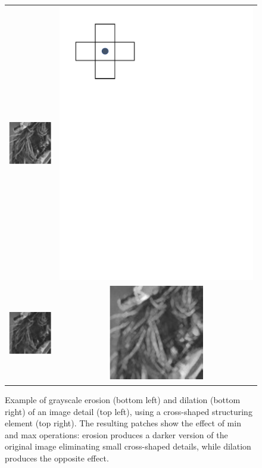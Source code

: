 \documentclass{ieeeaccess}
\begin{document}
\begin{figure}[t!]
	\centering
	\begin{tabular}{cc}
		\centering
		\includegraphics[width = 0.4\linewidth]{original} & \includegraphics[width = 0.4\linewidth]{mask} \\
		\includegraphics[width = 0.4\linewidth]{eroded} &  \includegraphics[width = 0.4\linewidth]{dilated} \\
	\end{tabular}
	\caption{Example of grayscale erosion (bottom left) and dilation (bottom right) of an image detail (top left), using a cross-shaped structuring element (top right). The resulting patches show the effect of min and max operations: erosion produces a darker version of the original image eliminating small cross-shaped details, while dilation produces the opposite effect.}
	\label{fig:grayscale_ex}
\end{figure}
\end{document}
